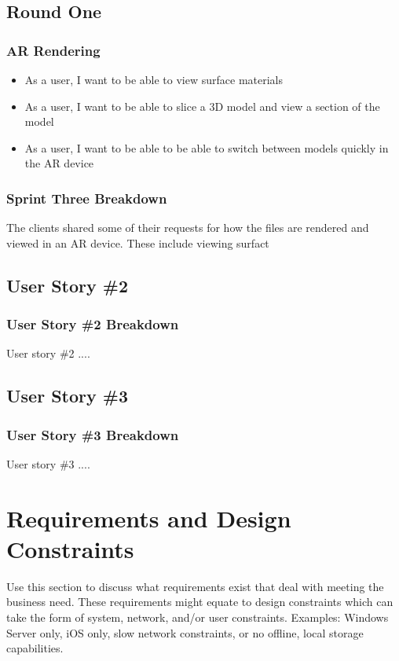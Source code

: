 \subsection{Round One}

\subsubsection{AR Rendering}

\begin{itemize}
	\item As a user, I want to be able to view surface materials
	\item As a user, I want to be able to slice a 3D model and view a section of the model
	\item As a user, I want to be able to be able to switch between models quickly in the AR device
\end{itemize}

\subsubsection{Sprint Three Breakdown}

The clients shared some of their requests for how the files are rendered and viewed in an AR device.  These include viewing surfact

\subsection{User Story \#2} 

\subsubsection{User Story \#2 Breakdown}
User story \#2  .... 

\subsection{User Story \#3} 

\subsubsection{User Story \#3 Breakdown}
User story \#3  .... 



\section{Requirements and Design Constraints}
Use this section to discuss what requirements exist that deal with meeting the 
business need.  These requirements might equate to design constraints which can 
take the form of system, network, and/or user constraints.  Examples:  Windows 
Server only, iOS only, slow network constraints, or no offline, local storage capabilities. 


